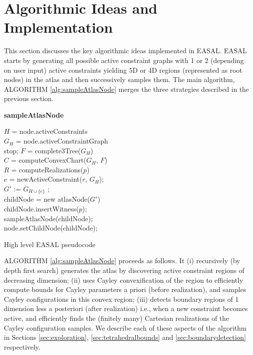 \section{Algorithmic Ideas and Implementation}
\label{algorithms}
This section discusses the key algorithmic ideas implemented in EASAL. EASAL
starts by generating all possible active constraint graphs with 1 or 2
(depending on user input) active constraints yielding 5D or 4D regions
(represented as root nodes) in the atlas and then successively samples them.
The main algorithm, ALGORITHM \ref{alg:sampleAtlasNode} merges the three
strategies described in the previous section.

\begin{algorithm} [htbp]

 {\bf sampleAtlasNode}\\
 \BlankLine

	$H$ = node.activeConstraints\\
	$G_H$ = node.activeConstraintGraph\\
		{stop;	}
	$F$ = complete3Tree($G_H$)\\
	
	$C$ = computeConvexChart($G_H$, $F$)\\

	{
		$R$ = computeRealizations($p$)\\

		{
			{
				{
					$e$ = newActiveConstraint($r$, $G_H$);\\
					$G'$ := $G_{H \cup \{e\}}$ ;\\
					{
						childNode = new atlasNode($G'$)\\
						childNode.insertWitness($p$);\\
						sampleAtlasNode(childNode);\\
					} 
					node.setChildNode(childNode);
				} 
			}
		}
	}
	\caption{High level EASAL pseudocode}
\label{alg:sampleAtlasNode}
\end{algorithm}


ALGORITHM \ref{alg:sampleAtlasNode} proceeds as follows. It (i) recursively
(by depth first search) generates the atlas by discovering active constraint
regions of decreasing dimension; (ii) uses Cayley convexification of the region
to efficiently compute bounds for Cayley parameters a priori (before
realization), and samples Cayley configurations in this convex region; (iii)
detects boundary regions of 1 dimension less a posteriori (after realization)
i.e., when a new constraint becomes active, and efficiently finds the (finitely
many) Cartesian realizations of the Cayley configuration samples. We describe
each of these aspects of the algorithm in Sections \ref{sec:exploration},
\ref{sec:tetrahedralbounds} and \ref{sec:boundarydetection} respectively.

